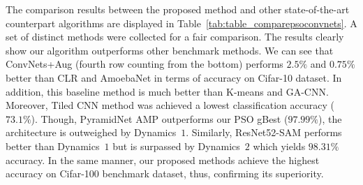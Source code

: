 \documentclass{ieeeaccess}
\begin{document}
The comparison results between the proposed method and other state-of-the-art counterpart algorithms are displayed in Table~\ref{tab:table_comparepsoconvnets}. A set of distinct methods were collected for a fair comparison. The results clearly show our algorithm outperforms other benchmark methods. We can see that ConvNets+Aug (fourth row counting from the bottom) performs $2.5\%$ and $0.75\%$ better than CLR and AmoebaNet in terms of accuracy on Cifar-10 dataset. In addition, this baseline method is much better than K-means and GA-CNN. Moreover, Tiled CNN method was achieved a lowest classification accuracy ($73.1\%$). Though, PyramidNet AMP outperforms our PSO gBest ($97.99\%$), the architecture is outweighed by Dynamics~$1$. Similarly, ResNet52-SAM performs better than Dynamics~$1$ but is surpassed by Dynamics~$2$ which yields $98.31\%$ accuracy. In the same manner, our proposed methods achieve the highest accuracy on Cifar-100 benchmark dataset, thus, confirming its superiority.
\end{document}
